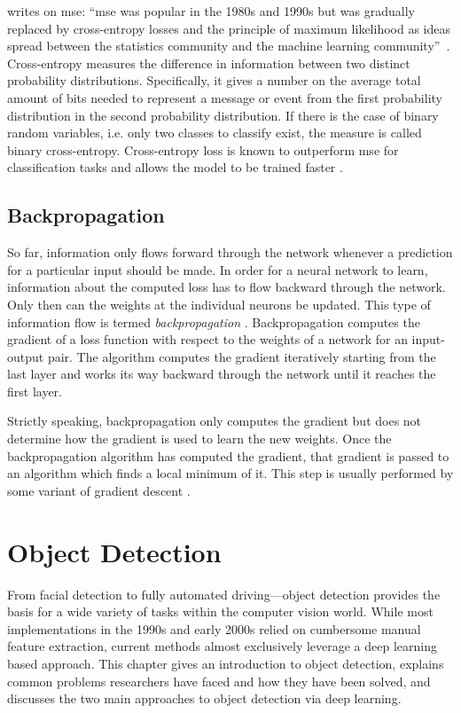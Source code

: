\documentclass[final]{vutinfth} %
\begin{document}
\textcite{goodfellow2016} writes on \gls{mse}: ``\gls{mse} was popular
in the 1980s and 1990s but was gradually replaced by cross-entropy
losses and the principle of maximum likelihood as ideas spread between
the statistics community and the machine learning
community''~\cite[p.222]{goodfellow2016}. Cross-entropy measures the
difference in information between two distinct probability
distributions. Specifically, it gives a number on the average total
amount of bits needed to represent a message or event from the first
probability distribution in the second probability distribution. If
there is the case of binary random variables, i.e. only two classes to
classify exist, the measure is called binary
cross-entropy. Cross-entropy loss is known to outperform \gls{mse} for
classification tasks and allows the model to be trained
faster \cite{simard2003}.

\subsection{Backpropagation}
\label{ssec:theory-backprop}

So far, information only flows forward through the network whenever a
prediction for a particular input should be made. In order for a
neural network to learn, information about the computed loss has to
flow backward through the network. Only then can the weights at the
individual neurons be updated. This type of information flow is termed
\emph{backpropagation} \cite{rumelhart1986}. Backpropagation computes
the gradient of a loss function with respect to the weights of a
network for an input-output pair. The algorithm computes the gradient
iteratively starting from the last layer and works its way backward
through the network until it reaches the first layer.

Strictly speaking, backpropagation only computes the gradient but does
not determine how the gradient is used to learn the new weights. Once
the backpropagation algorithm has computed the gradient, that gradient
is passed to an algorithm which finds a local minimum of it. This step
is usually performed by some variant of gradient descent
\cite{cauchy1847}.

\section{Object Detection}
\label{sec:background-detection}

From facial detection to fully automated driving—object detection
provides the basis for a wide variety of tasks within the computer
vision world. While most implementations in the 1990s and early 2000s
relied on cumbersome manual feature extraction, current methods almost
exclusively leverage a deep learning based approach. This chapter
gives an introduction to object detection, explains common problems
researchers have faced and how they have been solved, and discusses
the two main approaches to object detection via deep learning.
\end{document}
